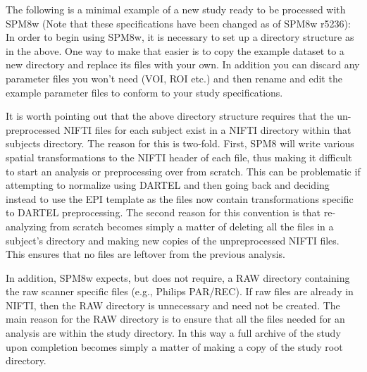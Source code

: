 \documentclass[12pt]{article}
\begin{document}
\noindent The following is a minimal example of a new study ready to be processed with SPM8w (Note that these specifications have been changed as of SPM8w r5236):
\vspace{\baselineskip}
\vspace{\baselineskip}
In order to begin using SPM8w, it is necessary to set up a directory structure as in the above. One way to make that easier is to copy the example dataset to a new directory and replace its files with your own. In addition you can discard any parameter files you won't need (VOI, ROI etc.) and then rename and edit the example parameter files to conform to your study specifications. 

It is worth pointing out that the above directory structure requires that the un-preprocessed NIFTI files for each subject exist in a NIFTI directory within that subjects directory. The reason for this is two-fold. First, SPM8 will write various spatial transformations to the NIFTI header of each file, thus making it difficult to start an analysis or preprocessing over from scratch. This can be problematic if attempting to normalize using DARTEL and then going back and deciding instead to use the EPI template as the files now contain transformations specific to DARTEL preprocessing. The second reason for this convention is that re-analyzing from scratch becomes simply a matter of deleting all the files in a subject's directory and making new copies of the unpreprocessed NIFTI files. This ensures that no files are leftover from the previous analysis. 

In addition, SPM8w expects, but does not require, a RAW directory containing the raw scanner specific files (e.g., Philips PAR/REC). If raw files are already in NIFTI, then the RAW directory is unnecessary and need not be created. The main reason for the RAW directory is to ensure that all the files needed for an analysis are within the study directory. In this way a full archive of the study upon completion becomes simply a matter of making a copy of the study root directory. 
\end{document}
